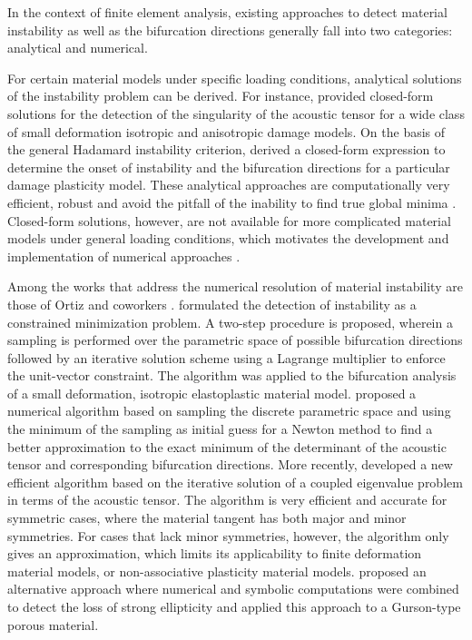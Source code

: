 \documentclass[12pt]{article}
\numberwithin{equation}{section}
\begin{document}
In the context of finite element analysis, existing approaches to
detect material instability as well as the bifurcation directions
generally fall into two categories: analytical and numerical.

For certain material models under specific loading conditions,
analytical solutions of the instability problem can be derived. For
instance, \citet{Oliver.Huespe:2004} provided closed-form solutions
for the detection of the singularity of the acoustic tensor for a wide
class of small deformation isotropic and anisotropic damage models. On
the basis of the general Hadamard instability criterion,
\citet{Xue.Belytschko:2010} derived a closed-form expression to
determine the onset of instability and the bifurcation directions for
a particular damage plasticity model. These analytical approaches are
computationally very efficient, robust and avoid the pitfall of the
inability to find true global minima \cite{Oliver.etal:2010}.
Closed-form solutions, however, are not available for more complicated
material models under general loading conditions, which motivates the
development and implementation of numerical approaches
\cite{Mosler:2005}.

Among the works that address the numerical resolution of material
instability are those of Ortiz and coworkers \cite{Ortiz:1987,
  Ortiz.etal:1987}.  \citet{Ortiz.etal:1987} formulated the detection
of instability as a constrained minimization problem. A two-step
procedure is proposed, wherein a sampling is performed over the
parametric space of possible bifurcation directions followed by an
iterative solution scheme using a Lagrange multiplier to enforce the
unit-vector constraint. The algorithm was applied to the bifurcation
analysis of a small deformation, isotropic elastoplastic material
model.  \citet{Mosler:2005} proposed a numerical algorithm based on
sampling the discrete parametric space and using the minimum of the
sampling as initial guess for a Newton method to find a better
approximation to the exact minimum of the determinant of the acoustic
tensor and corresponding bifurcation directions. More recently,
\citet{Oliver.etal:2010} developed a new efficient algorithm based on
the iterative solution of a coupled eigenvalue problem in terms of the
acoustic tensor. The algorithm is very efficient and accurate for
symmetric cases, where the material tangent has both major and minor
symmetries. For cases that lack minor symmetries, however, the
algorithm only gives an approximation, which limits its applicability
to finite deformation material models, or non-associative plasticity
material models. \citet{Boussaa-Aravas:2001} proposed an alternative
approach where numerical and symbolic computations were combined to
detect the loss of strong ellipticity and applied this approach to a
Gurson-type porous material.
\end{document}
